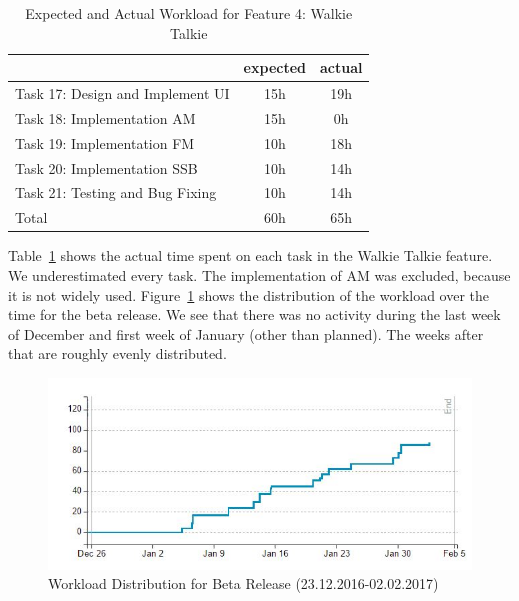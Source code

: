 	\begin{table}
	\centering
	\caption{Expected and Actual Workload for Feature 4: Walkie Talkie}
	\label{tab:alpha:feature4}
	\begin{tabular}{ l | c | c }
		& expected  & actual \\ \hline
		Task 17: Design and Implement UI& 15h & 19h \\ \hline
		Task 18: Implementation AM& 15h & 0h  \\ \hline
		Task 19: Implementation FM& 10h & 18h  \\ \hline
		Task 20: Implementation SSB& 10h & 14h \\ \hline 
		Task 21: Testing and Bug Fixing& 10h & 14h \\ \hline \hline
		Total & 60h & 65h
	\end{tabular}
\end{table}

Table~\ref{tab:alpha:feature4} shows the actual time spent on each task in the Walkie Talkie feature. We underestimated every task. The implementation of AM was excluded, because it is not widely used. 
Figure~\ref{fig:agilefant_beta} shows the distribution of the workload over the time for the beta release. We see that there was no activity during the last week of December and first week of January (other than planned). The weeks after that are roughly evenly distributed. 

\begin{figure}
	\centering
	\includegraphics[width=1\linewidth]{gfx/Agilefant_Beta.jpg}
	\caption{Workload Distribution for Beta Release (23.12.2016-02.02.2017)}
	\label{fig:agilefant_beta}
\end{figure}